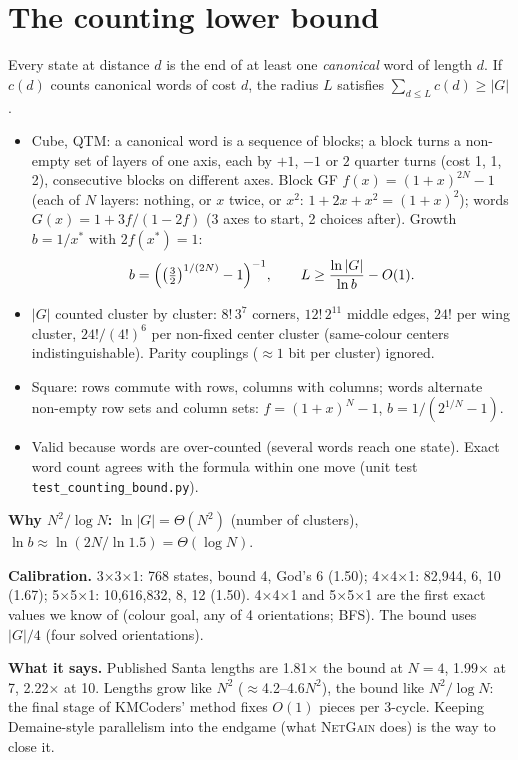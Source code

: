 \documentclass[10.5pt,a4paper]{article}
\newcommand{\Sq}[1]{#1$\times$#1$\times$1}
\newcommand{\M}[1]{\textsc{#1}}
\begin{document}
\section{The counting lower bound}
Every state at distance $d$ is the end of at least one \emph{canonical} word of length $d$. If $c(d)$ counts canonical words of
cost $d$, the radius $L$ satisfies $\sum_{d\le L}c(d)\ge|G|$.
\begin{itemize}
\item Cube, QTM: a canonical word is a sequence of blocks; a block turns a non-empty set of layers of one axis, each by $+1$, $-1$
or $2$ quarter turns (cost 1, 1, 2), consecutive blocks on different axes. Block GF $f(x)=(1+x)^{2N}-1$ (each of $N$ layers:
nothing, or $x$ twice, or $x^2$: $1+2x+x^2=(1+x)^2$); words $G(x)=1+3f/(1-2f)$ (3 axes to start, 2 choices after). Growth
$b=1/x^\ast$ with $2f(x^\ast)=1$:
\[ b=\Bigl(\bigl(\tfrac32\bigr)^{1/(2N)}-1\Bigr)^{-1},\qquad L\ge\frac{\ln|G|}{\ln b}-O(1). \]
\item $|G|$ counted cluster by cluster: $8!\,3^7$ corners, $12!\,2^{11}$ middle edges, $24!$ per wing cluster, $24!/(4!)^6$ per
non-fixed center cluster (same-colour centers indistinguishable). Parity couplings ($\approx1$ bit per cluster) ignored.
\item Square: rows commute with rows, columns with columns; words alternate non-empty row sets and column sets: $f=(1+x)^N-1$,
$b=1/(2^{1/N}-1)$.
\item Valid because words are over-counted (several words reach one state). Exact word count agrees with the formula within one
move (unit test \texttt{test\_counting\_bound.py}).
\end{itemize}
\textbf{Why $N^2/\log N$:} $\ln|G|=\Theta(N^2)$ (number of clusters), $\ln b\approx\ln(2N/\ln 1.5)=\Theta(\log N)$.

\textbf{Calibration.} \Sq{3}: 768 states, bound 4, God's 6 (1.50); \Sq{4}: 82,944, 6, 10 (1.67); \Sq{5}: 10,616,832, 8, 12 (1.50).
\Sq{4} and \Sq{5} are the first exact values we know of (colour goal, any of 4 orientations; BFS). The bound uses $|G|/4$ (four
solved orientations).

\textbf{What it says.} Published Santa lengths are 1.81$\times$ the bound at $N=4$, 1.99$\times$ at 7, 2.22$\times$ at 10.
Lengths grow like $N^2$ ($\approx$4.2--4.6$N^2$), the bound like $N^2/\log N$: the final stage of KMCoders' method fixes $O(1)$
pieces per 3-cycle. Keeping Demaine-style parallelism into the endgame (what \M{NetGain} does) is the way to close it.
\end{document}
